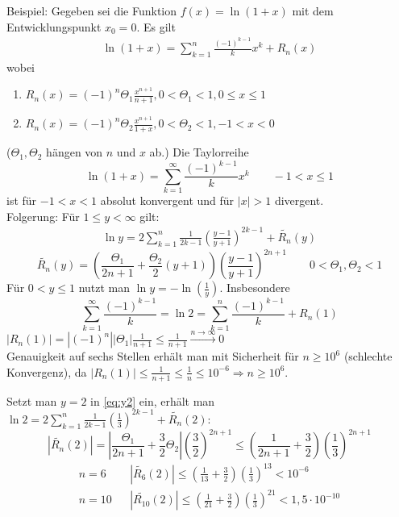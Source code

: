 \documentclass[ngerman,titlepage,twoside, parskip=half*]{scrreprt}
\theoremstyle{plain}
\theoremstyle{definition}
\theoremstyle{remark}
\begin{document}
Beispiel: Gegeben sei die Funktion $f(x)=\ln(1+x)$ mit dem
Entwicklungspunkt $x_0=0$. Es gilt
\begin{gather}
  \label{eq:y2}
  \ln(1+x)=\sum_{k=1}^n \frac{(-1)^{k-1}}{k}x^k+R_n(x)
\end{gather}
wobei
\begin{enumerate}
  \item $R_n(x)=(-1)^n\Theta_1\frac{x^{n+1}}{n+1}, 0<\Theta_1<1, 0\leq x\leq 1$
  \item $R_n(x)=(-1)^n\Theta_2\frac{x^{n+1}}{1+x}, 0<\Theta_2<1, -1<x<0$
\end{enumerate}
($\Theta_1, \Theta_2$ hängen von $n$ und $x$ ab.)
Die Taylorreihe
\[\ln(1+x)=\sum_{k=1}^\infty \frac{(-1)^{k-1}}{k}x^k\qquad -1<x\leq 1\]
ist für $-1<x<1$ absolut konvergent und für $|x|>1$ divergent.\\
Folgerung: Für $1\leq y<\infty$ gilt: 
\begin{gather*}
  \ln y=2\sum_{k=1}^n \frac{1}{2k-1}\left(\frac{y-1}{y+1}\right)^{2k-1}
  +\widetilde{R_n}(y)
\end{gather*}
\[\widetilde{R_n}(y)=\left(\frac{\Theta_1}{2n+1}+\frac{\Theta_2}{2}(y+1)\right)
\left(\frac{y-1}{y+1}\right)^{2n+1}\qquad 0<\Theta_1,\Theta_2<1\]
Für $0<y\leq 1$ nutzt man $\ln y=-\ln(\frac{1}{y})$. Insbesondere
\[\sum_{k=1}^\infty \frac{(-1)^{k-1}}{k}=\ln 2=\sum_{k=1}^n
\frac{(-1)^{k-1}}{k}+R_n(1)\]
$|R_n(1)|=|(-1)^n||\Theta_1|\frac{1}{n+1}\leq\frac{1}{n+1}
\xrightarrow{n\rightarrow\infty}0$\\
Genauigkeit auf sechs Stellen erhält man mit Sicherheit für $n\geq 10^6$
(schlechte Konvergenz), da  $|R_n(1)|\leq \frac{1}{n+1}\leq \frac{1}{n}\leq 10^{-6}
\Rightarrow n\geq 10^6$.

Setzt man $y=2$ in \autoref{eq:y2} ein, erhält man $\ln 2=2\sum_{k=1}^n 
\frac{1}{2k-1}\left( \frac{1}{3} \right)^{2k-1}+\widetilde{R_n}(2)$:
\[|\widetilde{R_n}(2)|=\left|\frac{\Theta_1}{2n+1}+\frac{3}{2}\Theta_2\right|
\left( \frac{3}{2} \right)^{2n+1}\leq\left( \frac{1}{2n+1}+\frac{3}{2} \right)
\left( \frac{1}{3} \right)^{2n+1}\]
\begin{align*}
  n=6 & & |\widetilde{R_6}(2)|\leq \left( \frac{1}{13}+\frac{3}{2} \right)
  \left( \frac{1}{3} \right)^{13}<10^{-6}\\
  n=10 & & |\widetilde{R_{10}}(2)|\leq \left( \frac{1}{21}+\frac{3}{2} \right)
  \left( \frac{1}{3} \right)^{21}<1,5\cdot 10^{-10}
\end{align*}
\end{document}
